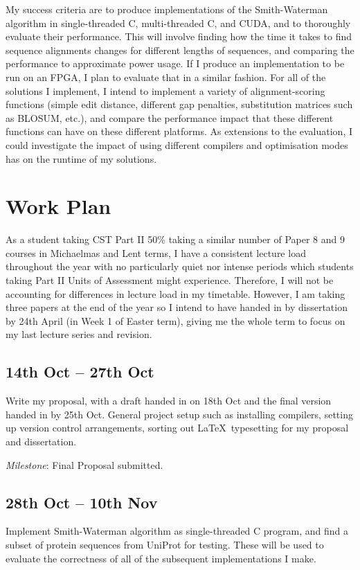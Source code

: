 My success criteria are to produce implementations of the Smith-Waterman algorithm in single-threaded C, multi-threaded C, and CUDA, and to thoroughly evaluate their performance.
This will involve finding how the time it takes to find sequence alignments changes for different lengths of sequences, and comparing the performance to approximate power usage.
If I produce an implementation to be run on an FPGA, I plan to evaluate that in a similar fashion.
For all of the solutions I implement, I intend to implement a variety of alignment-scoring functions (simple edit distance, different gap penalties, substitution matrices such as BLOSUM, etc.), and compare the performance impact that these different functions can have on these different platforms.
As extensions to the evaluation, I could investigate the impact of using different compilers and optimisation modes has on the runtime of my solutions.

\section*{Work Plan}

As a student taking CST Part II 50\% taking a similar number of Paper 8 and 9 courses in Michaelmas and Lent terms, I have a consistent lecture load throughout the year with no particularly quiet nor intense periods which students taking Part II Units of Assessment might experience.
Therefore, I will not be accounting for differences in lecture load in my timetable.
However, I am taking three papers at the end of the year so I intend to have handed in by dissertation by 24th April (in Week 1 of Easter term), giving me the whole term to focus on my last lecture series and revision.

\subsection*{14th Oct -- 27th Oct}
Write my proposal, with a draft handed in on 18th Oct and the final version handed in by 25th Oct.
General project setup such as installing compilers, setting up version control arrangements, sorting out \LaTeX\ typesetting for my proposal and dissertation.

\textit{Milestone}: Final Proposal submitted.

\subsection*{28th Oct -- 10th Nov}
Implement Smith-Waterman algorithm as single-threaded C program, and find a subset of protein sequences from UniProt \cite{UniProt} for testing.
These will be used to evaluate the correctness of all of the subsequent implementations I make.

